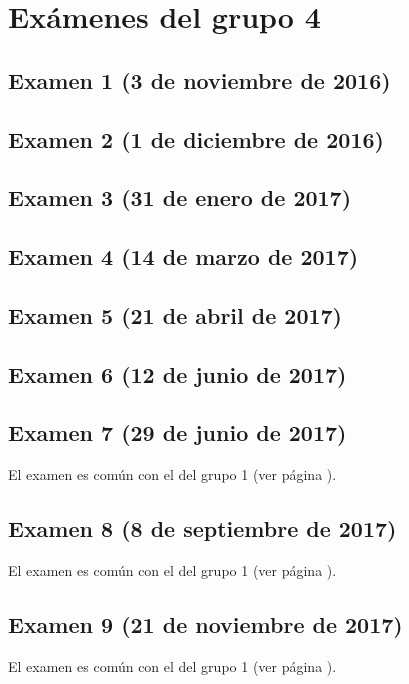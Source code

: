 \documentclass[a4paper,12pt,twoside]{book}
\begin{document}
\chapter{Exámenes del grupo 4}
\section{Examen 1 (3 de noviembre de 2016)}
\section{Examen 2 (1 de diciembre de 2016)}
\section{Examen 3 (31 de enero de 2017)}
 \label{examen_16_17_4_3}
\section{Examen 4 (14 de marzo de 2017)}
\section{Examen 5 (21 de abril de 2017)}
\section{Examen 6 (12 de junio de 2017)} 
 \label{examen_16_17_4_6}
\section{Examen 7 (29 de junio de 2017)}
El examen es común con el del grupo 1 (ver página \pageref{examen_16_17_1_7}).
\section{Examen 8 (8 de septiembre de 2017)}
El examen es común con el del grupo 1 (ver página \pageref{examen_16_17_1_8}).
\section{Examen 9 (21 de noviembre de 2017)}
El examen es común con el del grupo 1 (ver página \pageref{examen_16_17_1_9}).
\end{document}
